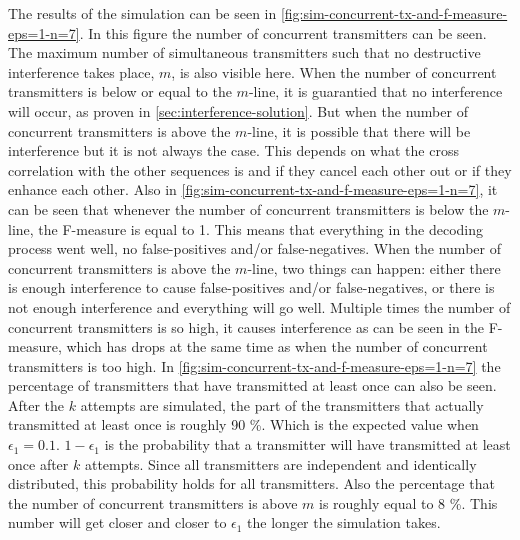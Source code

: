 The results of the simulation can be seen in \autoref{fig:sim-concurrent-tx-and-f-measure-eps=1-n=7}.
In this figure the number of concurrent transmitters can be seen. 
The maximum number of simultaneous transmitters such that no destructive interference takes place, $m$, is also visible here.
When the number of concurrent transmitters is below or equal to the $m$-line, it is guarantied that no interference will occur, as proven in \autoref{sec:interference-solution}.
But when the number of concurrent transmitters is above the $m$-line, it is possible that there will be interference but it is not always the case.
This depends on what the cross correlation with the other sequences is and if they cancel each other out or if they enhance each other.
Also in \autoref{fig:sim-concurrent-tx-and-f-measure-eps=1-n=7}, it can be seen that whenever the number of concurrent transmitters is below the $m$-line, the F-measure is equal to 1.
This means that everything in the decoding process went well, no false-positives and/or false-negatives.
When the number of concurrent transmitters is above the $m$-line, two things can happen: either there is enough interference to cause false-positives and/or false-negatives, or there is not enough interference and everything will go well.
Multiple times the number of concurrent transmitters is so high, it causes interference as can be seen in the F-measure, which has drops at the same time as when the number of concurrent transmitters is too high.
In \autoref{fig:sim-concurrent-tx-and-f-measure-eps=1-n=7} the percentage of transmitters that have transmitted at least once can also be seen.
After the $k$ attempts are simulated, the part of the transmitters that actually transmitted at least once is roughly 90 \%.
Which is the expected value when $\epsilon_1 = 0.1$.
$1 - \epsilon_1$ is the probability that a transmitter will have transmitted at least once after $k$ attempts.
Since all transmitters are independent and identically distributed, this probability holds for all transmitters.
Also the percentage that the number of concurrent transmitters is above $m$ is roughly equal to 8 \%.
This number will get closer and closer to $\epsilon_1$ the longer the simulation takes.





